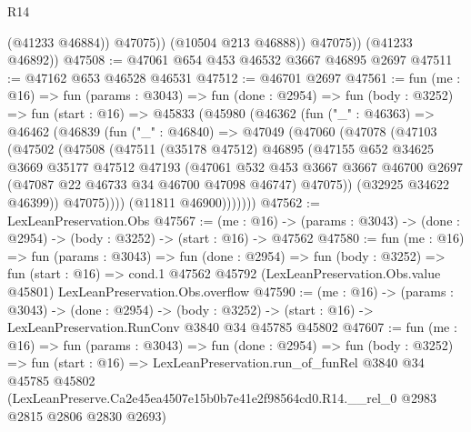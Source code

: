 \begin{lexlean}{R14}
\begin{coremodule}
                  (@41233 @46884))
                @47075))
            (@10504 @213 @46888))
          @47075))
      (@41233 @46892))
@47508 := @47061 @654 @453 @46532 @3667 @46895 @2697
@47511 := @47162 @653 @46528 @46531
@47512 := @46701 @2697
@47561 := fun (me : @16) =>
  fun (params : @3043) =>
  fun (done : @2954) =>
  fun (body : @3252) =>
  fun (start : @16) =>
  @45833
    (@45980
      (@46362
        (fun ("_" : @46363) =>
        @46462
          (@46839
            (fun ("_" : @46840) =>
            @47049
              (@47060
                (@47078
                  (@47103
                    (@47502
                      (@47508
                        (@47511
                          (@35178 @47512)
                          @46895
                          (@47155
                            @652
                            @34625
                            @3669
                            @35177
                            @47512
                            @47193
                            (@47061
                              @532
                              @453
                              @3667
                              @3667
                              @46700
                              @2697
                              (@47087 @22 @46733 @34 @46700 @47098 @46747)
                              @47075))
                          (@32925 @34622 @46399))
                        @47075))))
                (@11811 @46900)))))))
@47562 := LexLeanPreservation.Obs
@47567 := (me : @16) ->
  (params : @3043) -> (done : @2954) -> (body : @3252) -> (start : @16) -> @47562
@47580 := fun (me : @16) =>
  fun (params : @3043) =>
  fun (done : @2954) =>
  fun (body : @3252) =>
  fun (start : @16) =>
  cond.{1} @47562 @45792 (LexLeanPreservation.Obs.value @45801) LexLeanPreservation.Obs.overflow
@47590 := (me : @16) ->
  (params : @3043) ->
  (done : @2954) ->
  (body : @3252) -> (start : @16) -> LexLeanPreservation.RunConv @3840 @34 @45785 @45802
@47607 := fun (me : @16) =>
  fun (params : @3043) =>
  fun (done : @2954) =>
  fun (body : @3252) =>
  fun (start : @16) =>
  LexLeanPreservation.run_of_funRel
    @3840
    @34
    @45785
    @45802
    (LexLeanPreserve.Ca2e45ea4507e15b0b7e41e2f98564cd0.R14.__rel_0 @2983 @2815 @2806 @2830 @2693)
\end{coremodule}
\end{lexlean}
